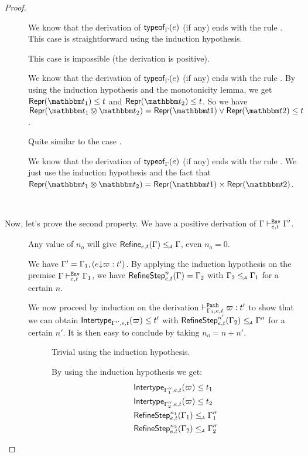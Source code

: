 \documentclass[a4paper]{article}
\theoremstyle{definition}
\begin{document}
\begin{proof}
\begin{description}
    \item[] We know that the derivation of $\textsf{typeof}_{\Gamma}(e)$ (if any) ends with the rule .
    This case is straightforward using the induction hypothesis.
    \item[] This case is impossible (the derivation is positive).
    \item[] We know that the derivation of $\textsf{typeof}_{\Gamma}(e)$ (if any) ends with the rule .
    By using the induction hypothesis and the monotonicity lemma, we get $\tsrep{\ts_1}\leq t$ and $\tsrep{\ts_2}\leq t$.
    So we have $\tsrep{\ts_1\tsor\ts_2}=\tsrep{\ts1}\vee\tsrep{\ts2}\leq t$.
    \item[] Quite similar to the case .
    \item[] We know that the derivation of $\textsf{typeof}_{\Gamma}(e)$ (if any) ends with the rule .
    We just use the induction hypothesis and the fact that $\tsrep{\ts_1\tstimes\ts_2}=\pair {\tsrep{\ts1}} {\tsrep{\ts2}}$.
  \end{description}

  \ 

  Now, let's prove the second property. We have a positive derivation of $\Gamma \vdash^{\texttt{Env}}_{e,t} \Gamma'$.

  \begin{description}
    \item[] Any value of $n_o$ will give $\textsf{Refine}_{e,t}(\Gamma) \leq_{\!\scriptscriptstyle\mathcal{A}} \Gamma$, even $n_o = 0$.
    \item[] We have $\Gamma' = \Gamma_1,(e{\downarrow}\varpi:t')$.
    By applying the induction hypothesis on the premise $\Gamma \vdash^{\texttt{Env}}_{e,t} \Gamma_1$, we have
    $\textsf{RefineStep}_{e,t}^n (\Gamma) = \Gamma_2$ with $\Gamma_2 \leq_{\!\scriptscriptstyle\mathcal{A}} \Gamma_1$ for a certain $n$.

    We now proceed by induction on the derivation $\vdash^{\texttt{Path}}_{\Gamma_1,e,t} \varpi:t'$
    to show that we can obtain $\textsf{Intertype}_{\Gamma'',e,t} (\varpi) \leq t'$ with $\textsf{RefineStep}_{e,t}^{n'} (\Gamma_2) \leq_{\!\scriptscriptstyle\mathcal{A}} \Gamma''$
    for a certain $n'$. It is then easy to conclude by taking $n_o = n+n'$.

    \begin{description}
      \item[] Trivial using the induction hypothesis.
      \item[] By using the induction hypothesis we get:
      \begin{align*}
        &\textsf{Intertype}_{\Gamma_1'',e,t} (\varpi) \leq t_1\\
        &\textsf{Intertype}_{\Gamma_2'',e,t} (\varpi) \leq t_2\\
        &\textsf{RefineStep}_{e,t}^{n_1} (\Gamma_1) \leq_{\!\scriptscriptstyle\mathcal{A}} \Gamma_1''\\
        &\textsf{RefineStep}_{e,t}^{n_2} (\Gamma_2) \leq_{\!\scriptscriptstyle\mathcal{A}} \Gamma_2''
      \end{align*}
      

\end{description}
\end{description}
\end{proof}
\end{document}

